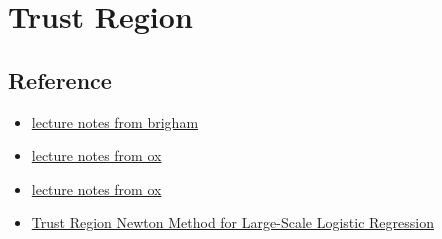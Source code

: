 \chapter{Trust Region}\label{chp:trust_region}

\section{Reference}
\begin{itemize}
    \item \href{https://acme.byu.edu/0000017a-1bb8-db63-a97e-7bfa0bd80000/vol2lab19trustregion-pdf}{lecture notes from brigham}
    \item \href{https://www.numerical.rl.ac.uk/people/nimg/course/lectures/raphael/lectures/lec6slides.4.pdf}{lecture notes from ox}
    \item \href{https://people.maths.ox.ac.uk/hauser/hauser_lecture3.pdf}{lecture notes from ox}
    \item \href{https://www.csie.ntu.edu.tw/~cjlin/papers/logistic.pdf}{Trust Region Newton Method for Large-Scale Logistic Regression}
\end{itemize}